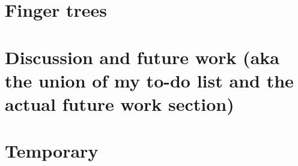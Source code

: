 \documentclass{article}
\theoremstyle{plain}%
\theoremstyle{definition}
\begin{document}
\section{Finger trees}\label{sec:fingertrees}



\section{Discussion and future work (aka the union of my to-do list and the actual future work section)}\label{sec:discussion}



\section{Temporary}\label{sec:temp}
\listoftodos
%


\printbibliography
\end{document}
